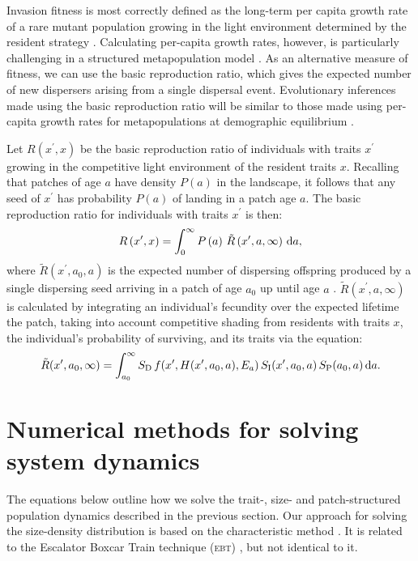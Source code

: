 \documentclass[10pt,twoside]{article}
\begin{document}
Invasion fitness is most correctly defined as the long-term per capita
growth rate of a rare mutant population growing in the light environment
determined by the resident strategy \citep{Metz-1992}. Calculating
per-capita growth rates, however, is particularly challenging in a
structured metapopulation model \citep{Gyllenberg-2001, Metz-2001}. As
an alternative measure of fitness, we can use the basic reproduction
ratio, which gives the expected number of new dispersers arising from a
single dispersal event. Evolutionary inferences made using the basic
reproduction ratio will be similar to those made using per-capita growth
rates for metapopulations at demographic equilibrium
\citep{Gyllenberg-2001, Metz-2001}.

Let \(R\left(x^\prime, x\right)\) be the basic reproduction ratio of
individuals with traits \(x^\prime\) growing in the competitive
light environment of the resident traits \(x\). Recalling that patches of age
\(a\) have density \(P(a)\) in the landscape, it follows that any seed
of \(x^\prime\) has probability \(P(a)\) of landing in a patch age
\(a\). The basic reproduction ratio for individuals with traits
\(x^\prime\) is then:
\begin{equation} \label{eq:InvFit}
  R\left(x^\prime,x\right) = \int _0^{\infty} P\left(a\right) \, \tilde{R}\left(x^\prime, a, \infty \right) \, {\rm d}a ,
\end{equation}
where \(\tilde{R}\left(x^\prime, a_0, a \right)\) is the expected number
of dispersing offspring produced by a single dispersing seed arriving in
a patch of age \(a_0\) up until age \(a\)
\citep{Gyllenberg-2001, Metz-2001}.
\(\tilde{R}\left(x^\prime, a,\infty\right)\) is calculated by integrating
an individual's fecundity over the expected lifetime the patch, taking
into account competitive shading from residents with traits \(x\), the
individual's probability of surviving, and its traits via the equation:
\begin{equation} \label{eq:tildeR}
  \tilde{R}(x^\prime, a_0, \infty) = \int_{a_0}^{\infty}  S_{\rm D} \, f(x^\prime, H(x^\prime, a_0, a), E_{a}) \, S_{\rm I} (x^\prime, a_0, a) \, S_{\rm P} (a_0, a) \, {\rm d} a.
\end{equation}

\section{Numerical methods for solving system dynamics}

The equations below outline how we solve the trait-, size- and patch-structured
population dynamics described in the previous section.
Our approach for solving the size-density distribution is based on the characteristic method \citep{Angulo-2004}. It is related to
the Escalator Boxcar Train technique (\textsc{ebt})
\citep{Deroos-1988, Deroos-1997, Deroos-1992}, but not identical to it.
\end{document}
